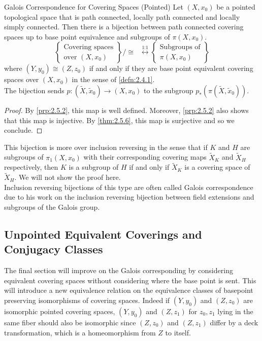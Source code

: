 \documentclass[a4paper]{article}
\begin{document}
\begin{thm}{Galois Correspondence for Covering Spaces (Pointed)}{} Let $(X,x_0)$ be a pointed topological space that is path connected, locally path connected and locally simply connected. Then there is a bijection between path connected covering spaces up to base point equivalence and subgroups of $\pi(X,x_0)$. $$\left\{\substack{\text{Covering spaces}\\\text{over }(X,x_0)}\right\}/\cong\;\;\overset{\text{1:1}}{\longleftrightarrow}\left\{\substack{\text{Subgroups of}\\ \pi(X,x_0)}\right\}$$ where $(Y,y_0)\cong(Z,z_0)$ if and only if they are base point equivalent covering spaces over $(X,x_0)$ in the sense of \ref{defn:2.4.1}. \\

The bijection sends $p:(\widetilde{X},\widetilde{x}_0)\to(X,x_0)$ to the subgroup $p_\ast(\pi(\widetilde{X},\widetilde{x}_0))$. 
\begin{proof}
By \ref{prp:2.5.2}, this map is well defined. Moreover, \ref{prp:2.5.2} also shows that this map is injective. By \ref{thm:2.5.6}, this map is surjective and so we conclude. 
\end{proof}
\end{thm}

This bijection is more over inclusion reversing in the sense that if $K$ and $H$ are subgroups of $\pi_1(X,x_0)$ with their corresponding covering maps $\widetilde{X}_K$ and $\widetilde{X}_H$ respectively, then $K$ is a subgroup of $H$ if and only if $\widetilde{X}_K$ is a covering space of $\widetilde{X}_H$. We will not show the proof here. \\

Inclusion reversing bijections of this type are often called Galois correspondence due to his work on the inclusion reversing bijection between field extensions and subgroups of the Galois group. 

\subsection{Unpointed Equivalent Coverings and Conjugacy Classes}
The final section will improve on the Galois corresponding by considering equivalent covering spaces without considering where the base point is sent. This will introduce a new equivalence relation on the equivalence classes of basepoint preserving isomorphisms of covering spaces. Indeed if $(Y,y_0)$ and $(Z,z_0)$ are isomorphic pointed covering spaces, $(Y,y_0)$ and $(Z,z_1)$ for $z_0,z_1$ lying in the same fiber should also be isomorphic since $(Z,z_0)$ and $(Z,z_1)$ differ by a deck transformation, which is a homeomorphism from $Z$ to itself. \\
\end{document}
